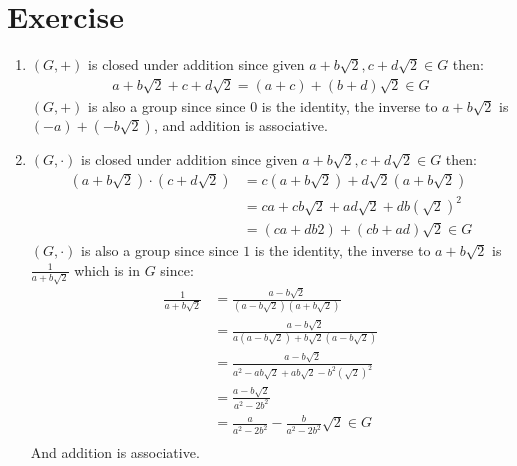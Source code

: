\documentclass{article}
\begin{document}
\section{Exercise}
\begin{enumerate}[label=(\alph*)]
    \item $(G, +)$ is closed under addition since given $a + b\sqrt{2},
    c + d\sqrt{2} \in G$ then:
    \begin{align*}
        a + b\sqrt{2} + c + d\sqrt{2} = (a + c) + (b + d)\sqrt{2} \in G
    \end{align*}
    $(G, +)$ is also a group since since $0$ is the identity, the inverse to
    $a + b\sqrt{2}$ is $(-a) + (-b\sqrt{2})$, and addition is associative.
    \item $(G, \cdot)$ is closed under addition since given $a + b\sqrt{2},
    c + d\sqrt{2} \in G$ then:
    \begin{align*}
        (a + b\sqrt{2}) \cdot (c + d\sqrt{2}) &= c(a + b\sqrt{2}) + d\sqrt{2}(a + b\sqrt{2}) \\
        &= ca + cb\sqrt{2} + ad\sqrt{2} + db(\sqrt{2})^2 \\
        &= (ca + db2) + (cb + ad)\sqrt{2} \in G
    \end{align*}
    $(G, \cdot)$ is also a group since since $1$ is the identity, the inverse to
    $a + b\sqrt{2}$ is $\frac{1}{a + b\sqrt{2}}$ which is in $G$ since:
    \begin{align*}
        \frac{1}{a + b\sqrt{2}} &= \frac{a - b\sqrt{2}}{(a - b\sqrt{2})(a + b\sqrt{2})} \\
        &= \frac{a - b\sqrt{2}}{a(a - b\sqrt{2}) + b\sqrt{2}(a - b\sqrt{2})} \\
        &= \frac{a - b\sqrt{2}}{a^2 - ab\sqrt{2} + ab\sqrt{2} - b^2(\sqrt{2})^2} \\
        &= \frac{a - b\sqrt{2}}{a^2 - 2b^2} \\
        &= \frac{a}{a^2 - 2b^2} - \frac{b}{a^2 - 2b^2}\sqrt{2} \in G \\
    \end{align*}
    And addition is associative.
\end{enumerate}
\end{document}
